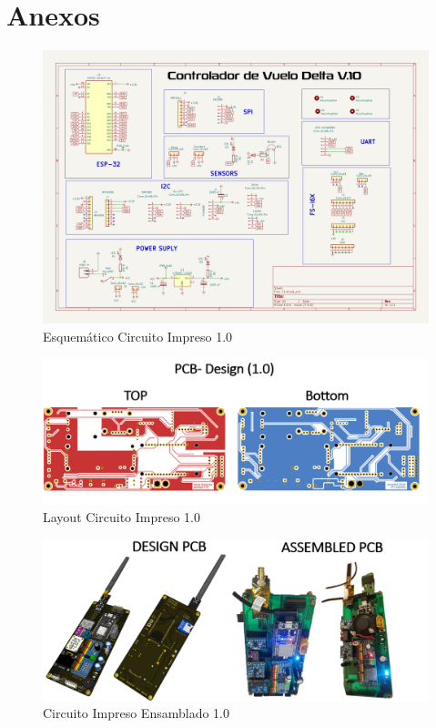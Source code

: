 

\section{Anexos}

\begin{figure}[H]
    \centering
    \includegraphics[width=\textwidth]{Imagenes/Anexos/esquematico_controlador_v1.png}
    \caption{Esquemático Circuito Impreso 1.0 }
    \label{fig:sch-1.0}
\end{figure}

\begin{figure}[H]
    \centering
    \includegraphics[width=\textwidth]{Imagenes/Anexos/layout_pcb.png}
    \caption{Layout Circuito Impreso 1.0 }
    \label{fig:pcb-1.0}
\end{figure}

\begin{figure}[H]
    \centering
    \includegraphics[width=\textwidth]{Imagenes/Anexos/pcb_primera_iteracion.png}
    \caption{Circuito Impreso Ensamblado 1.0 }
    \label{fig:pcb-ensambled-1.0}
\end{figure}

